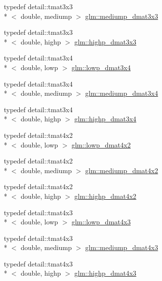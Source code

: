 \begin{DoxyCompactItemize}
\item 
typedef detail\-::tmat3x3\\*
$<$ double, mediump $>$ \hyperlink{group__core__precision_ga2f73508d8192390ca9f9b569f544fade}{glm\-::mediump\-\_\-dmat3x3}
\item 
typedef detail\-::tmat3x3\\*
$<$ double, highp $>$ \hyperlink{group__core__precision_gad7229dea82287910d88e6e8566e39fc7}{glm\-::highp\-\_\-dmat3x3}
\item 
typedef detail\-::tmat3x4\\*
$<$ double, lowp $>$ \hyperlink{group__core__precision_ga4640e1d20ad705842525e79a4cc57b15}{glm\-::lowp\-\_\-dmat3x4}
\item 
typedef detail\-::tmat3x4\\*
$<$ double, mediump $>$ \hyperlink{group__core__precision_gaedd814e706701200b13b86fc6fd7b373}{glm\-::mediump\-\_\-dmat3x4}
\item 
typedef detail\-::tmat3x4\\*
$<$ double, highp $>$ \hyperlink{group__core__precision_gaff199c8d04a8edb92ed43283e8694c59}{glm\-::highp\-\_\-dmat3x4}
\item 
typedef detail\-::tmat4x2\\*
$<$ double, lowp $>$ \hyperlink{group__core__precision_ga28a7ef670069c3707f19b9de1039517e}{glm\-::lowp\-\_\-dmat4x2}
\item 
typedef detail\-::tmat4x2\\*
$<$ double, mediump $>$ \hyperlink{group__core__precision_ga03056b616496470371473cd5df4dc1f8}{glm\-::mediump\-\_\-dmat4x2}
\item 
typedef detail\-::tmat4x2\\*
$<$ double, highp $>$ \hyperlink{group__core__precision_gaa4fb1ed350a6cd053abb9b093d13ce0d}{glm\-::highp\-\_\-dmat4x2}
\item 
typedef detail\-::tmat4x3\\*
$<$ double, lowp $>$ \hyperlink{group__core__precision_gabc1be51eb0cae7cd4b1d6483a954c35d}{glm\-::lowp\-\_\-dmat4x3}
\item 
typedef detail\-::tmat4x3\\*
$<$ double, mediump $>$ \hyperlink{group__core__precision_gafa1ba33d2748737129cde471fedbf9c5}{glm\-::mediump\-\_\-dmat4x3}
\item 
typedef detail\-::tmat4x3\\*
$<$ double, highp $>$ \hyperlink{group__core__precision_gaf8aeba0eecc5c651e0f06414b6e37754}{glm\-::highp\-\_\-dmat4x3}
\item 

\end{DoxyCompactItemize}
